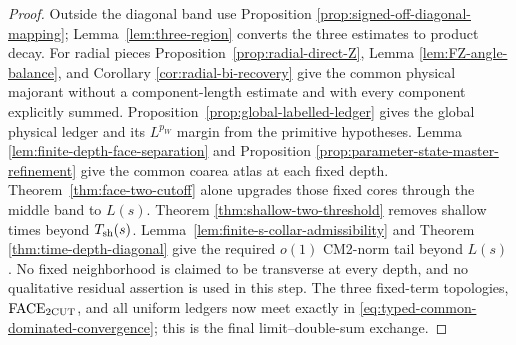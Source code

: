 \documentclass[11pt]{article}
\begin{document}
\begin{proof}
Outside the diagonal band use Proposition
\ref{prop:signed-off-diagonal-mapping};
Lemma~\ref{lem:three-region} converts the three estimates to product decay.
For radial pieces Proposition~\ref{prop:radial-direct-Z}, Lemma
\ref{lem:FZ-angle-balance}, and Corollary
\ref{cor:radial-bi-recovery} give the common physical majorant without a
component-length estimate and with every component explicitly summed.
Proposition~\ref{prop:global-labelled-ledger} gives the global physical
ledger and its $L^{p_W}$ margin from the primitive hypotheses.  Lemma
\ref{lem:finite-depth-face-separation} and Proposition
\ref{prop:parameter-state-master-refinement} give the common coarea atlas at
each fixed depth.  Theorem~\ref{thm:face-two-cutoff} alone upgrades those
fixed cores through the middle band to $L(s)$.  Theorem
\ref{thm:shallow-two-threshold} removes shallow times beyond
$T_{\rm sh}(s)$.  Lemma~\ref{lem:finite-s-collar-admissibility} and Theorem
\ref{thm:time-depth-diagonal} give the required $o(1)$ CM2-norm tail beyond
$L(s)$.  No fixed neighborhood is
claimed to be transverse at every depth, and no qualitative residual
assertion is used in this step.  The three fixed-term topologies,
$\mathrm{FACE}_{\rm 2CUT}$, and all uniform ledgers now meet exactly in
\eqref{eq:typed-common-dominated-convergence}; this is the final
limit--double-sum exchange.
\end{proof}
\end{document}
